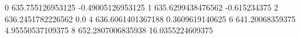 0 635.755126953125 -0.49005126953125
1 635.6299438476562 -0.615234375
2 636.2451782226562 0.0
4 636.6061401367188 0.3609619140625
6 641.20068359375 4.95550537109375
8 652.2807006835938 16.0355224609375
